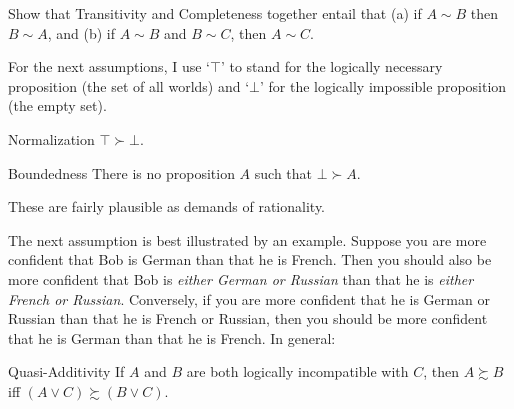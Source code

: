 \begin{exercise}{3}
  Show that Transitivity and Completeness together entail that (a) if
  $A \sim B$ then $B \sim A$, and (b) if $A \sim B$ and $B \sim C$,
  then $A \sim C$.
\end{exercise}


For the next assumptions, I use `$\top$' to stand for the logically
necessary proposition (the set of all worlds) and `$\bot$' for the
logically impossible proposition (the empty set).
%
\begin{genericthm}{Normalization}
  $\top \succ \bot$.
\end{genericthm}
\vspace{-2mm}
\begin{genericthm}{Boundedness}
  There is no proposition $A$ such that $\bot \succ A$.
\end{genericthm}
These are fairly plausible as demands of rationality. 

The next assumption is best illustrated by an example. Suppose you are
more confident that Bob is German than that he is French.  Then you
should also be more confident that Bob is \emph{either German or
  Russian} than that he is \emph{either French or
  Russian}. Conversely, if you are more confident that he is German or
Russian than that he is French or Russian, then you should be more
confident that he is German than that he is French. In general:

\begin{genericthm}{Quasi-Additivity}
  If $A$ and $B$ are both logically incompatible with $C$, then $A
  \succsim B$ iff $(A \lor C) \succsim (B \lor C)$.
\end{genericthm}

